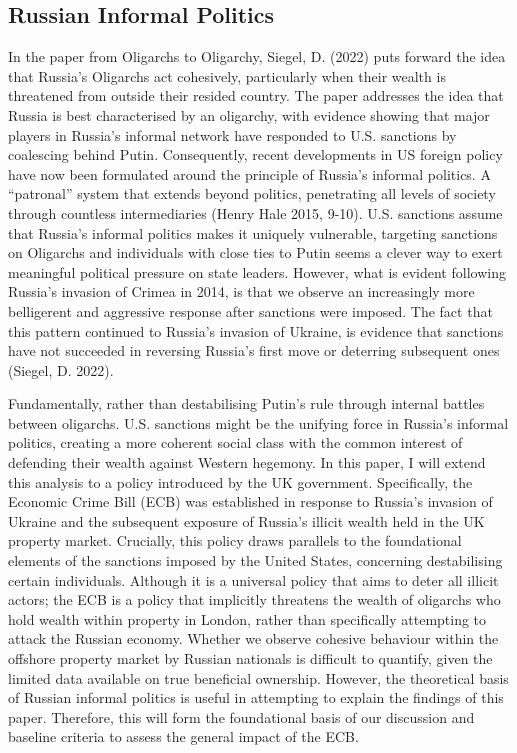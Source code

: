 \documentclass{article}
\begin{document}
\subsection{Russian Informal Politics}
In the paper from Oligarchs to Oligarchy, Siegel, D. (2022) puts forward the idea that Russia’s Oligarchs act cohesively, particularly when their wealth is threatened from outside their resided country. The paper addresses the idea that Russia is best characterised by an oligarchy, with evidence showing that major players in Russia’s informal network have responded to U.S. sanctions by coalescing behind Putin. Consequently, recent developments in US foreign policy have now been formulated around the principle of Russia’s informal politics. A “patronal” system that extends beyond politics, penetrating all levels of society through countless intermediaries (Henry Hale 2015, 9-10).  U.S. sanctions assume that Russia’s informal politics makes it uniquely vulnerable, targeting sanctions on Oligarchs and individuals with close ties to Putin seems a clever way to exert meaningful political pressure on state leaders. However, what is evident following Russia’s invasion of Crimea in 2014, is that we observe an increasingly more belligerent and aggressive response after sanctions were imposed. The fact that this pattern continued to Russia's invasion of Ukraine, is evidence that sanctions have not succeeded in reversing Russia’s first move or deterring subsequent ones (Siegel, D. 2022).  

Fundamentally, rather than destabilising Putin’s rule through internal battles between oligarchs. U.S. sanctions might be the unifying force in Russia’s informal politics, creating a more coherent social class with the common interest of defending their wealth against Western hegemony. In this paper, I will extend this analysis to a policy introduced by the UK government. Specifically, the Economic Crime Bill (ECB) was established in response to Russia’s invasion of Ukraine and the subsequent exposure of Russia's illicit wealth held in the UK property market. Crucially, this policy draws parallels to the foundational elements of the sanctions imposed by the United States, concerning destabilising certain individuals. Although it is a universal policy that aims to deter all illicit actors; the ECB is a policy that implicitly threatens the wealth of oligarchs who hold wealth within property in London, rather than specifically attempting to attack the Russian economy. Whether we observe cohesive behaviour within the offshore property market by Russian nationals is difficult to quantify, given the limited data available on true beneficial ownership. However, the theoretical basis of Russian informal politics is useful in attempting to explain the findings of this paper. Therefore, this will form the foundational basis of our discussion and baseline criteria to assess the general impact of the ECB.
\end{document}
